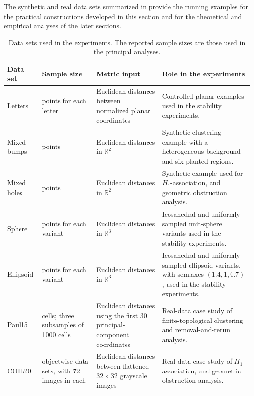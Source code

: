 \documentclass[a4paper,11pt]{article}
\theoremstyle{definition}
\theoremstyle{remark}
\begin{document}
The synthetic and real data sets summarized in  provide the running examples for the practical constructions developed in this section and for the theoretical and empirical analyses of the later sections.
\begin{table}[!ht]
\centering
\small
\caption{Data sets used in the experiments. The reported sample sizes are those used in the principal analyses.}
\label{tab:data-set-catalogue}
\setlength{\tabcolsep}{4pt}
\renewcommand{\arraystretch}{1.15}
\begin{tabular}{@{}
  >{\raggedright\arraybackslash}p{}
  >{\raggedright\arraybackslash}p{}
  >{\raggedright\arraybackslash}p{}
  >{\raggedright\arraybackslash}p{}
  @{}}
\toprule
Data set
& Sample size
& Metric input
& Role in the experiments
\\
\midrule

Letters
& 500 points for each letter
& Euclidean distances between normalized planar coordinates
& Controlled planar examples used in the stability experiments.
\\
\addlinespace

Mixed bumps
& 775 points
& Euclidean distances in $\mathbb R^2$
& Synthetic clustering example with a heterogeneous background and six planted regions.
\\
\addlinespace

Mixed holes
& 800 points
& Euclidean distances in $\mathbb R^2$
& Synthetic example used for $H_1$-association, and geometric obstruction analysis.
\\
\addlinespace

Sphere
& 642 points for each variant
& Euclidean distances in $\mathbb R^3$
& Icosahedral and uniformly sampled unit-sphere variants used in the stability experiments.
\\
\addlinespace

Ellipsoid
& 642 points for each variant
& Euclidean distances in $\mathbb R^3$
& Icosahedral and uniformly sampled ellipsoid variants, with semiaxes $(1.4,1,0.7)$, used in the stability experiments.
\\
\addlinespace

Paul15
& 2730 cells; three subsamples of 1000 cells
& Euclidean distances using the first 30 principal-component coordinates
& Real-data case study of finite-topological clustering and removal-and-rerun analysis.
\\
\addlinespace

COIL20
& 20 objectwise data sets, with 72 images in each
& Euclidean distances between flattened $32\times32$ grayscale images
& Real-data case study of $H_1$-association, and geometric obstruction analysis.
\\
\bottomrule
\end{tabular}
\end{table}
\end{document}
